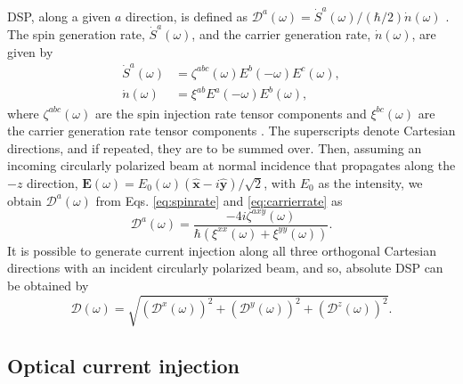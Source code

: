 \documentclass[pss]{wiley2sp} %
\begin{document}
DSP, along a given $a$ direction, is
defined as
$\mathcal{D}^{a}(\omega)=\dot{S}^{a}(\omega)/(\hbar/2)\dot{n}(\omega)$
\cite{mendozaPRB12}. The spin generation rate, $\dot{S}^{a}(\omega)$, and the
carrier generation rate, $\dot{n}(\omega)$, are given by
\begin{align}
\dot{S}^{a}(\omega)&= 
\zeta^{abc}(\omega)E^{b}(-\omega)E^{c}(\omega), \label{eq:spinrate} \\
\dot{n}(\omega)&= 
\xi^{ab}E^{a}(-\omega)E^{b}(\omega), \label{eq:carrierrate}
\end{align}
where $\zeta^{abc}(\omega)$ are the spin injection rate tensor components and
$\xi^{bc}(\omega)$ are the carrier generation rate tensor components
\cite{arzatePRB14}. The superscripts denote Cartesian directions, and if repeated,
they are to be summed over. Then, assuming an incoming circularly polarized beam at
normal incidence that propagates along the $-z$ direction, $\mathbf{E}(\omega) =
E_{0}(\omega)(\mathbf{\hat{x}} - i\mathbf{\hat{y}})/\sqrt{2}$, with $E_{0}$ as
the intensity, we obtain $\mathcal{D}^{a}(\omega)$ from Eqs.
\eqref{eq:spinrate} and \eqref{eq:carrierrate} \cite{arzatePRB14} as
\begin{equation}\label{eq:D^i}
\mathcal{D}^{a}(\omega) =  
\frac{-4i\zeta^{axy}(\omega)}
    {\hbar\left(\xi^{xx}(\omega) + \xi^{yy}(\omega)\right)}.
\end{equation}
It is possible to generate current injection along all three orthogonal
Cartesian directions with an incident circularly polarized beam, and so,
absolute DSP can be obtained \cite{arzatePRB14} by 
\begin{equation}\label{eq:dsptotal}
\mathcal{D}(\omega) =
\sqrt{(\mathcal{D}^{x}(\omega))^{2} + 
      (\mathcal{D}^{y}(\omega))^{2} +
      (\mathcal{D}^{z}(\omega))^{2}
      }.
\end{equation}


\subsection{Optical current injection}\label{sec:theory-OCI}
\end{document}
